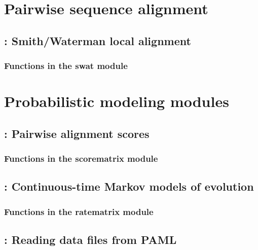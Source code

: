 \documentclass[10pt]{book}
\begin{document}
\chapter{Pairwise sequence alignment}

\newpage
\section{: Smith/Waterman local alignment}

\subsection{Functions in the swat module}




\chapter{Probabilistic modeling modules}

\newpage
\section{: Pairwise alignment scores}

\subsection{Functions in the scorematrix module}


\newpage
\section{: Continuous-time Markov models of evolution}

\subsection{Functions in the ratematrix module}


\newpage
\section{: Reading data files from PAML}

\end{document}
